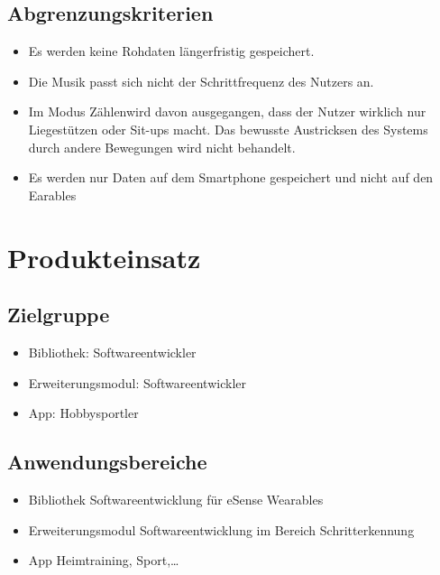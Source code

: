 \documentclass[a4paper,12pt]{article}
\begin{document}
  \subsection{Abgrenzungskriterien}
  \begin{itemize}
    \item\text Es werden keine Rohdaten längerfristig gespeichert. %
    \item\text Die Musik passt sich nicht der Schrittfrequenz des Nutzers an.
    \item\text Im Modus \glqq Zählen\grqq{}wird davon ausgegangen, dass der Nutzer wirklich nur Liegestützen oder Sit-ups macht. Das bewusste Austricksen des Systems durch andere Bewegungen wird nicht behandelt.
    \item\text Es werden nur Daten auf dem Smartphone gespeichert und nicht auf den \Gls{Earables}
  \end{itemize}

\section{Produkteinsatz}
  \subsection{Zielgruppe}
  \begin{itemize}
    \item\textsf{Bibliothek:} Softwareentwickler
    \item\textsf{Erweiterungsmodul:} Softwareentwickler
    \item\textsf{App:} Hobbysportler
  \end{itemize}
  \subsection{Anwendungsbereiche}
    \begin{itemize}
      \item\textsf{Bibliothek} Softwareentwicklung für eSense Wearables
      \item\textsf{Erweiterungsmodul} Softwareentwicklung im Bereich Schritterkennung %
      \item\textsf{App} Heimtraining, Sport,\dots
    \end{itemize}
\end{document}
